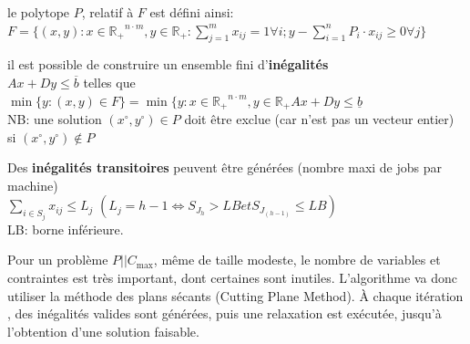 \documentclass[a4paper,12pt]{report}
\theoremstyle{plain}				%
\theoremstyle{definition}				%
\newcommand\problemGrahamP{$P||C_{\max}$}
\begin{document}
\bigskip
le polytope $P$, relatif à $F$ est défini ainsi: \\
$F=\{ (x,y) : x \in \mathbb{R_+}^{n \cdot m}, y \in \mathbb{R_+} : \sum_{j=1}^{m} x_{ij}=1 \forall i;
y-\sum_{i=1}^{n} P_i \cdot x_{ij} \geq 0 \forall j	\}$

\bigskip
il est possible de construire un ensemble fini d'\textbf{inégalités} \\
$Ax+Dy \leq \overline{b}$ telles que \\
$\min \{y : (x,y) \in F \} = \min \{y : x \in \mathbb{R_+}^{n \cdot m}, y \in \mathbb{R_+} Ax+Dy \leq \underline{b}$ \\
NB: une solution $(x \ensuremath{^\circ} , y\ensuremath{^\circ}) \in P$ doit être exclue (car n'est pas un vecteur entier) si $(x\ensuremath{^\circ}, y\ensuremath{^\circ}) \notin P $

\bigskip
Des \textbf{inégalités transitoires} peuvent être générées (nombre maxi de jobs par machine) \\
$\sum_{i \in S_j} x_{ij} \leq L_j$ \quad $(L_j = h-1 \iff S_{J_h} > LB et S_{J_{(h-1)}} \leq LB)$\\
LB: borne inférieure.

\bigskip

Pour un problème \problemGrahamP, même de taille modeste, le nombre de
variables et contraintes est très important, dont certaines sont
inutiles.
L'algorithme va donc utiliser la méthode des plans sécants (Cutting
Plane Method).
\`A chaque itération , des inégalités valides sont générées, puis une
relaxation est exécutée, jusqu'à l'obtention d'une solution faisable.
\end{document}
